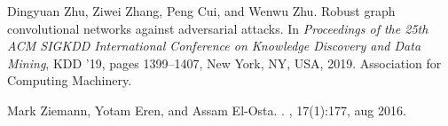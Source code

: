 \documentclass[11pt]{article}
\begin{document}
\begin{thebibliography}{10}
Dingyuan Zhu, Ziwei Zhang, Peng Cui, and Wenwu Zhu.
\newblock Robust graph convolutional networks against adversarial attacks.
\newblock In {\em Proceedings of the 25th ACM SIGKDD International Conference
  on Knowledge Discovery and Data Mining}, KDD '19, pages 1399--1407, New York,
  NY, USA, 2019. Association for Computing Machinery.

Mark Ziemann, Yotam Eren, and Assam El-Osta.
.
, 17(1):177, aug 2016.

\end{thebibliography}
\end{document}
